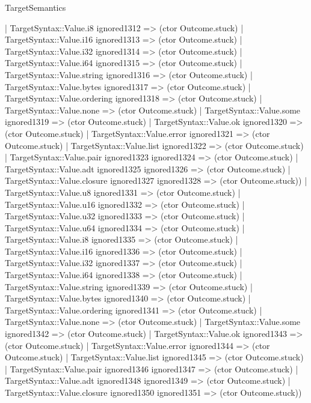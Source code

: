 \begin{lexlean}{TargetSemantics}
\begin{semanticmodule}
{              | TargetSyntax::Value.i8 ignored1312 => (ctor Outcome.stuck)
              | TargetSyntax::Value.i16 ignored1313 => (ctor Outcome.stuck)
              | TargetSyntax::Value.i32 ignored1314 => (ctor Outcome.stuck)
              | TargetSyntax::Value.i64 ignored1315 => (ctor Outcome.stuck)
              | TargetSyntax::Value.string ignored1316 => (ctor Outcome.stuck)
              | TargetSyntax::Value.bytes ignored1317 => (ctor Outcome.stuck)
              | TargetSyntax::Value.ordering ignored1318 => (ctor Outcome.stuck)
              | TargetSyntax::Value.none => (ctor Outcome.stuck)
              | TargetSyntax::Value.some ignored1319 => (ctor Outcome.stuck)
              | TargetSyntax::Value.ok ignored1320 => (ctor Outcome.stuck)
              | TargetSyntax::Value.error ignored1321 => (ctor Outcome.stuck)
              | TargetSyntax::Value.list ignored1322 => (ctor Outcome.stuck)
              | TargetSyntax::Value.pair ignored1323 ignored1324 => (ctor Outcome.stuck)
              | TargetSyntax::Value.adt ignored1325 ignored1326 => (ctor Outcome.stuck)
              | TargetSyntax::Value.closure ignored1327 ignored1328 => (ctor Outcome.stuck))
            | TargetSyntax::Value.u8 ignored1331 => (ctor Outcome.stuck)
            | TargetSyntax::Value.u16 ignored1332 => (ctor Outcome.stuck)
            | TargetSyntax::Value.u32 ignored1333 => (ctor Outcome.stuck)
            | TargetSyntax::Value.u64 ignored1334 => (ctor Outcome.stuck)
            | TargetSyntax::Value.i8 ignored1335 => (ctor Outcome.stuck)
            | TargetSyntax::Value.i16 ignored1336 => (ctor Outcome.stuck)
            | TargetSyntax::Value.i32 ignored1337 => (ctor Outcome.stuck)
            | TargetSyntax::Value.i64 ignored1338 => (ctor Outcome.stuck)
            | TargetSyntax::Value.string ignored1339 => (ctor Outcome.stuck)
            | TargetSyntax::Value.bytes ignored1340 => (ctor Outcome.stuck)
            | TargetSyntax::Value.ordering ignored1341 => (ctor Outcome.stuck)
            | TargetSyntax::Value.none => (ctor Outcome.stuck)
            | TargetSyntax::Value.some ignored1342 => (ctor Outcome.stuck)
            | TargetSyntax::Value.ok ignored1343 => (ctor Outcome.stuck)
            | TargetSyntax::Value.error ignored1344 => (ctor Outcome.stuck)
            | TargetSyntax::Value.list ignored1345 => (ctor Outcome.stuck)
            | TargetSyntax::Value.pair ignored1346 ignored1347 => (ctor Outcome.stuck)
            | TargetSyntax::Value.adt ignored1348 ignored1349 => (ctor Outcome.stuck)
            | TargetSyntax::Value.closure ignored1350 ignored1351 => (ctor Outcome.stuck))
}
\end{semanticmodule}
\end{lexlean}

